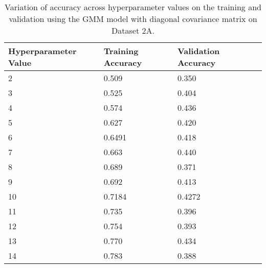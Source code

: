 \begin{table}[H]
\centering
\begin{tabular}{l l l l}
\hline
\hline
\textbf{Hyperparameter Value} & \textbf{Training Accuracy} & \textbf{Validation Accuracy}\\
\hline
\hline
2 & 0.509 & 0.350\\
3 & 0.525 & 0.404\\
4 & 0.574 & 0.436\\
5 & 0.627 & 0.420\\
6 & 0.6491 & 0.418\\
7 & 0.663 & 0.440\\
8 & 0.689 & 0.371\\
9 & 0.692 & 0.413\\
10 & 0.7184 & 0.4272\\
11 & 0.735 & 0.396\\
12 & 0.754 & 0.393\\
13 & 0.770 & 0.434\\
14 & 0.783 & 0.388\\
\hline
\end{tabular}
\caption{Variation of accuracy across hyperparameter values on the training and validation using the GMM model with diagonal covariance matrix on Dataset 2A. }
\label{tab:acc2a}
\end{table}

